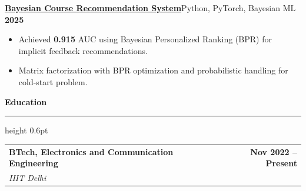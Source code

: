 \documentclass[10pt,letterpaper]{article}
\makeatletter
\newcommand{\sectiontitle}[1]{%
  \vspace{1pt}
  {\normalsize\bfseries\color{accent} #1}\par
  \vspace{0.5pt}
  {\color{accent}\hrule height 0.6pt}
  \vspace{1pt}
}
\newcommand{\entry}[4]{%
  \begin{tabularx}{\textwidth}{@{}X r@{}}
    {\bfseries #1} & {\footnotesize\bfseries #2} \\
    {\footnotesize\textit{#3}} & {\footnotesize #4}
  \end{tabularx}
  \vspace{0pt}
}
\newcommand{\projectentry}[2]{%
  {\bfseries #1}\hfill{\footnotesize #2}\par
  \vspace{0.5pt}
}
\newenvironment{tightitems}{%
  \begin{itemize}
    \setlength{\itemsep}{0pt}
    \setlength{\parskip}{0pt}
    \setlength{\parsep}{0pt}
    \setlength{\topsep}{0pt}
    \setlength{\leftmargin}{10pt}
    \setlength{\itemindent}{0pt}
}{%
  \end{itemize}
  \vspace{-2.5pt}
}
\makeatother
\begin{document}
\projectentry{\href{https://github.com/Saarthakkj/course_reccomendation}{Bayesian Course Recommendation System}}{Python, PyTorch, Bayesian ML \textbar{} \textbf{2025}}
\vspace{-3pt}
\begin{tightitems}
  \item Achieved \textbf{0.915} AUC using Bayesian Personalized Ranking (BPR) for implicit feedback recommendations.
  \item Matrix factorization with BPR optimization and probabilistic handling for cold-start problem.
\end{tightitems}
\vspace{-2pt}

\sectiontitle{Education}

\entry{BTech, Electronics and Communication Engineering}{\textbf{Nov 2022 -- Present}}{IIIT Delhi}{}
\end{document}
